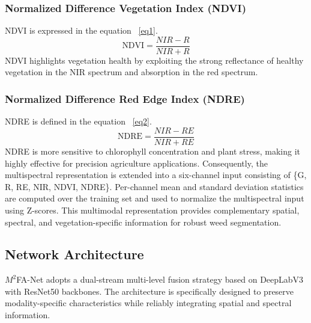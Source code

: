 \documentclass[pdflatex,sn-mathphys-num]{sn-jnl}
\begin{document}
\subsubsection{Normalized Difference Vegetation Index (NDVI)}
NDVI is expressed in the equation ~\ref{eq1}.
\begin{equation}
\text{NDVI} = \frac{NIR - R}{NIR + R}\label{eq1}
\end{equation}
NDVI \cite{rouse1974ndvi} highlights vegetation health by exploiting the strong reflectance of healthy vegetation in the NIR spectrum and absorption in the red spectrum.
\subsubsection{Normalized Difference Red Edge Index (NDRE)}
NDRE is defined in the equation ~\ref{eq2}.
\begin{equation}
\text{NDRE} = \frac{NIR - RE}{NIR + RE}\label{eq2}
\end{equation}
NDRE \cite{gitelson1997chlorophyll} is more sensitive to chlorophyll concentration and plant stress, making it highly effective for precision agriculture applications. Consequently, the multispectral representation is extended into a six-channel input consisting of \{G, R, RE, NIR, NDVI, NDRE\}. Per-channel mean and standard deviation statistics are computed over the training set and used to normalize the multispectral input using Z-scores. This multimodal representation provides complementary spatial, spectral, and vegetation-specific information for robust weed segmentation.

\subsection{Network Architecture}
$M^2$FA-Net adopts a dual-stream multi-level fusion strategy based on DeepLabV3 with ResNet50 backbones. The architecture is specifically designed to preserve modality-specific characteristics while reliably integrating spatial and spectral information.
\end{document}
